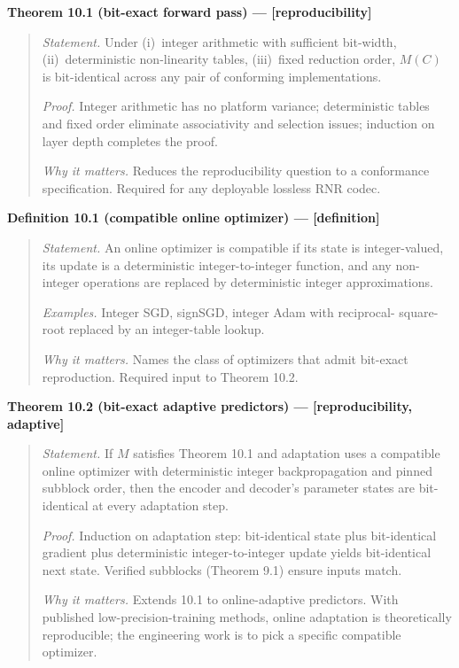 \documentclass[
]{article}
\begin{document}
\textbf{Theorem 10.1 (bit-exact forward pass) --- {[}reproducibility{]}}

\begin{quote}
\emph{Statement.} Under (i)~integer arithmetic with sufficient
bit-width, (ii)~deterministic non-linearity tables, (iii)~fixed
reduction order, $M(C)$ is bit-identical across any pair of
conforming implementations.

\emph{Proof.} Integer arithmetic has no platform variance; deterministic
tables and fixed order eliminate associativity and selection issues;
induction on layer depth completes the proof.

\emph{Why it matters.} Reduces the reproducibility question to a
conformance specification. Required for any deployable lossless RNR
codec.
\end{quote}

\textbf{Definition 10.1 (compatible online optimizer) ---
{[}definition{]}}

\begin{quote}
\emph{Statement.} An online optimizer is compatible if its state is
integer-valued, its update is a deterministic integer-to-integer
function, and any non-integer operations are replaced by deterministic
integer approximations.

\emph{Examples.} Integer SGD, signSGD, integer Adam with reciprocal-
square-root replaced by an integer-table lookup.

\emph{Why it matters.} Names the class of optimizers that admit
bit-exact reproduction. Required input to Theorem 10.2.
\end{quote}

\textbf{Theorem 10.2 (bit-exact adaptive predictors) ---
{[}reproducibility, adaptive{]}}

\begin{quote}
\emph{Statement.} If $M$ satisfies Theorem 10.1 and adaptation uses
a compatible online optimizer with deterministic integer
backpropagation and pinned subblock order, then the encoder and
decoder's parameter states are bit-identical at every adaptation
step.

\emph{Proof.} Induction on adaptation step: bit-identical state plus
bit-identical gradient plus deterministic integer-to-integer update
yields bit-identical next state. Verified subblocks (Theorem 9.1) ensure
inputs match.

\emph{Why it matters.} Extends 10.1 to online-adaptive predictors. With
published low-precision-training methods, online adaptation is
theoretically reproducible; the engineering work is to pick a specific
compatible optimizer.
\end{quote}
\end{document}
